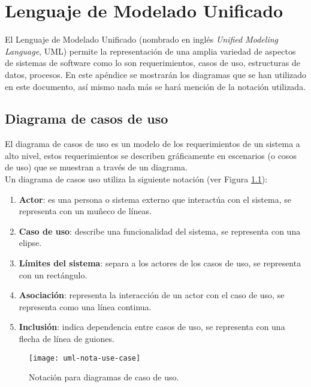 \chapter{Lenguaje de Modelado Unificado}

El Lenguaje de Modelado Unificado (nombrado en inglés \textit{Unified Modeling Language}, UML) permite la representación de una amplia variedad de aspectos de sistemas de software como lo son requerimientos, casos de uso, estructuras de datos, procesos\cite{UMLClassroom}. En este apéndice se mostrarán los diagramas que se han utilizado en este documento, así mismo nada más se hará mención de la notación utilizada.

\section{Diagrama de casos de uso}\label{sec:uml-cu}
El diagrama de casos de uso es un modelo de los requerimientos de un sistema a alto nivel, estos requerimientos se describen gráficamente en escenarios (o cosos de uso) que se muestran a través de un diagrama\cite{UMLClassroom, SoftwareEngineeringUML}.\\
Un diagrama de casos uso utiliza la siguiente notación\cite{UMLClassroom, SoftwareEngineeringUML} (ver Figura \ref{fig:uml-nota-use-case}):
\begin{enumerate}
  \item \textbf{Actor}: es una persona o sistema externo que interactúa con el sistema, se representa con un muñeco de líneas.
  \item \textbf{Caso de uso}: describe una funcionalidad del sistema, se representa con una elipse.
  \item \textbf{Límites del sistema}: separa a los actores de los casos de uso, se representa con un rectángulo.
  \item \textbf{Asociación}: representa la interacción de un actor con el caso de uso, se representa como una línea continua.
  \item \textbf{Inclusión}: indica dependencia entre casos de uso, se representa con una flecha de línea de guiones.
\end{enumerate}

\begin{figure}[h]
  \centering
  \texttt{[image: uml-nota-use-case]}
  \caption{Notación para diagramas de caso de uso\cite{SoftwareEngineeringUML}.}
  \label{fig:uml-nota-use-case}
\end{figure}

